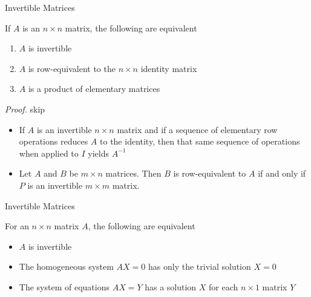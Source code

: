 \documentclass[8pt]{beamer}
\newcommand{\ti}[1]{\textit{#1}}
\begin{document}
\begin{frame}{Invertible Matrices}
  \begin{theorem}
    If $A$ is an $n \times n$ matrix, the following are equivalent
    \begin{enumerate}
      \item $A$ is invertible
      \item $A$ is row-equivalent to the $n \times n$ identity matrix
      \item $A$ is a product of elementary matrices
    \end{enumerate}
  \end{theorem}
  \ti{Proof.} skip

  \begin{corollary}
    \begin{itemize}
      \item If $A$ is an invertible $n\times n$ matrix and if a sequence of elementary row operations reduces $A$ to the identity, then that same sequence of operations when applied to $I$ yields $A^{-1}$
      \item Let $A$ and $B$ be $m \times n$ matrices. Then $B$ is row-equivalent to $A$ if and only if $P$ is an invertible $m \times m$ matrix.
    \end{itemize}
  \end{corollary}
\end{frame}


\begin{frame}{Invertible Matrices}
  \begin{theorem}
    For an $n \times n$ matrix $A$, the following are equivalent
    \begin{itemize}
      \item $A$ is invertible
      \item The homogeneous system $AX=0$ has only the trivial solution $X=0$
      \item The system of equations $AX=Y$ has a solution $X$ for each $n\times 1$ matrix $Y$
    \end{itemize}
  \end{theorem}
\end{frame}
\end{document}
